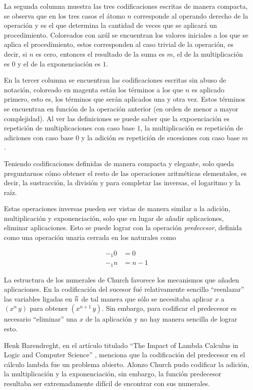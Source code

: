 La segunda columna muestra las tres codificaciones escritas de manera compacta, se observa que en los tres casos el átomo \( n \) corresponde al operando derecho de la operación y es el que determina la cantidad de veces que se aplicará un procedimiento. Coloreados con azúl se encuentran los valores iniciales a los que se aplica el procedimiento, estos corresponden al caso trivial de la operación, es decir, si \( n \) es cero, entonces el resultado de la suma es \( m \), el de la multiplicación es \( 0 \) y el de la exponenciación es \( 1 \).

En la tercer columna se encuentran las codificaciones escritas sin abuso de notación, coloreado en magenta están los términos a los que \( n \) es aplicado primero, esto es, los términos que serán aplicados una y otra vez. Estos términos se encuentran en función de la operación anterior (en orden de menor a mayor complejidad). Al ver las definiciones se puede saber que la expoenciación es repetición de multiplicaciones con caso base \( 1 \), la multiplicación es repetición de adiciones con caso base \( 0 \) y la adición es repetición de sucesiones con caso base \( m \).

Teniendo codificaciones definidas de manera compacta y elegante, solo queda preguntarnos cómo obtener el resto de las operaciones aritméticas elementales, es decir, la sustracción, la división y para completar las inversas, el logaritmo y la raíz.

Estas operaciones inversas pueden ser vistas de manera similar a la adición, multiplicación y exponenciación, solo que en lugar de añadir aplicaciones, eliminar aplicaciones. Esto se puede lograr con la operación \emph{predecesor}, definida como una operación unaria cerrada en los naturales como

\begin{align*}
  -_{1} 0 &= 0 \\
  -_{1} n &= n-1
\end{align*}

La estructura de los numerales de Church favorece los mecanismos que añaden aplicaciones. En la codificación del sucesor fué relativamente sencillo ``reenlazar'' las variables ligadas en \( \widehat{n} \) de tal manera que sólo se necesitaba aplicar \( x \) a \( (x^{n}\, y) \) para obtener \( (x^{n+1}\, y) \). Sin embargo, para codificar el predecesor es necesario ``eliminar'' una \( x \) de la aplicación y no hay manera sencilla de lograr esto.

Henk Barendreght, en el artículo titulado ``The Impact of Lambda Calculus in Logic and Computer Science'' \cite{Barendregt:Impact}, menciona que la codificación del predecesor en el cálculo lambda fue un problema abierto. Alonzo Church pudo codificar la adición, la multiplicación y la exponenciación, sin embargo, la función predecesor resultaba ser extremadamente difícil de encontrar con sus numerales.

